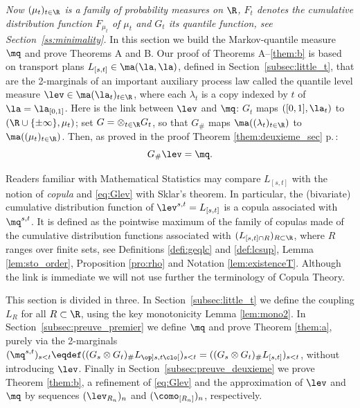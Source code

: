 \emph{Now $(\mu_t)_{t\in \R}$ is a family of probability measures on $\R$, $F_t$ denotes the cumulative distribution function $F_{\mu_t}$ of $\mu_t$ and $G_t$ its quantile function, see Section~\ref{ss:minimality}.} In this section we build the Markov-quantile measure $\mq$ and prove Theorems A and B. Our proof of Theorems A--\ref{them:b} is based on transport plans $L_{[s,t]}\in \ma(\la,\la)$, defined in Section~\ref{subsec:little_t}, that are the 2-marginals of an important auxiliary process law called the quantile level measure $\lev\in\ma(\la_t)_{t\in\R}$, where each $\lambda_t$ is a copy indexed by $t$ of $\la=\la_{[0,1]}$. Here is the link between $\lev$ and $\mq$: $G_t$ maps $([0,1],\la_t)$ to $(\R\cup\{\pm \infty\},\mu_t)$; set $G=\otimes_{t\in\R}G_t$, so that $G_\#$ maps $\ma((\lambda_t)_{t\in\R})$ to $\ma((\mu_t)_{t\in\R})$. Then, as proved in the proof Theorem \ref{them:deuxieme_sec} p.\,\pageref{lieu_preuve_glev}:\vspace*{-3pt}
\begin{equation}\label{eq:Glev}
G_\#\lev=\mq.
\end{equation}

\begin{rem}
Readers familiar with Mathematical Statistics may compare $L_{[s,t]}$ with the notion of \emph{copula} and \eqref{eq:Glev} with Sklar's theorem. In particular, the (bivariate) cumulative distribution function of $\lev^{s,t}=L_{[s,t]}$ is a copula associated with $\mq^{s,t}$. It is defined as the pointwise maximum of the family of copulas made of the cumulative distribution functions associated with $(L_{[s,t]\cap R})_{R\subset \R}$, where $R$ ranges over finite sets, see Definitions \ref{defi:geqlc} and \ref{def:lcsup}, Lemma \ref{lem:sto_order}, Proposition \ref{pro:rho} and Notation \ref{lem:existenceT}. Although the link is immediate we will not use further the terminology of Copula Theory.
\end{rem}

This section is divided in three. In Section~\ref{subsec:little_t} we define the coupling $L_R$ for all $R\subset \R$, using the key monotonicity Lemma \ref{lem:mono2}. In Section~\ref{subsec:preuve_premier} we define $\mq$ and prove Theorem \ref{them:a}, purely via the 2-marginals $(\mq^{s,t})_{s<t}\eqdef((G_s\otimes G_t)_\#L_{\op]s,t\clo[})_{s<t}=((G_s\otimes G_t)_\#L_{[s,t]})_{s<t}$, \ie without introducing $\lev$. Finally in Section~\ref{subsec:preuve_deuxieme} we prove Theorem \ref{them:b}, \ie a refinement of \eqref{eq:Glev} and the approximation of $\lev$ and $\mq$ by sequences $(\lev_{R_n})_n$ and $(\como_{[R_n]})_n$, respectively.

